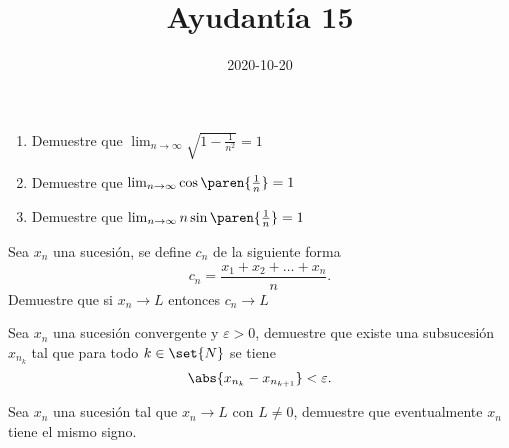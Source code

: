 \documentclass{ayudantia}
\title{Ayudantía 15}
\date{2020-10-20}
\begin{document}
\maketitle


\begin{prob}
    \begin{enumerate}[label=(\alph*)]
        \item Demuestre que \(\lim_{n\rightarrow\infty}\sqrt{1-\frac1{n^2}}=1\)
        \item Demuestre que \(\lim_{n\rightarrow\infty}\cos\paren{\frac1n}=1\)
        \item Demuestre que \(\lim_{n\rightarrow\infty}n\sin\paren{\frac1n}=1\)
    \end{enumerate}
\end{prob}

\begin{ans}
    \begin{sol}

    \end{sol}
\end{ans}



\begin{prob}
    Sea \(x_n\) una sucesión, se define \(c_n\) de la siguiente forma
    \begin{equation*}
        c_n=\frac{x_1+x_2+\ldots+x_n}n.
    \end{equation*}
    Demuestre que si \(x_n\rightarrow L\) entonces \(c_n\rightarrow L\)
\end{prob}

\begin{ans}
    \begin{sol}

    \end{sol}
\end{ans}



\begin{prob}
    Sea \(x_n\) una sucesión convergente y \(\varepsilon>0\), demuestre que existe una subsucesión \(x_{n_k}\) tal que para todo \(k\in\set{N}\) se tiene
    \begin{equation*}
        \abs{x_{n_k}-x_{n_{k+1}}}<\varepsilon.
    \end{equation*}
\end{prob}

\begin{ans}
    \begin{sol}

    \end{sol}
\end{ans}


\begin{prob}
    Sea \(x_n\) una sucesión tal que \(x_n\rightarrow L\) con \(L\neq0\), demuestre que eventualmente \(x_n\) tiene el mismo signo.
\end{prob}

\begin{ans}
    \begin{sol}

    \end{sol}
\end{ans}
\end{document}
